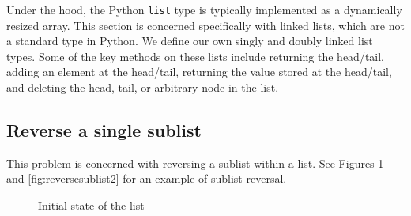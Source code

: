 \documentclass[11pt,a4paper]{article}
\begin{document}
Under the hood, the Python \texttt{list} type is typically implemented as a
dynamically resized array. This section is concerned specifically with linked
lists, which are not a standard type in Python. We define our own singly and
doubly linked list types. Some of the key methods on these lists include
returning the head/tail, adding an element at the head/tail, returning the
value stored at the head/tail, and deleting the head, tail, or arbitrary node
in the list.

\subsection{Reverse a single sublist}

This problem is concerned with reversing a sublist within a list. See Figures
\ref{fig:reversesublist1} and \ref{fig:reversesublist2} for an example of
sublist reversal.

\begin{figure}[htb]
  \centering
  \caption{Initial state of the list}
  \label{fig:reversesublist1}
\end{figure}
\end{document}
